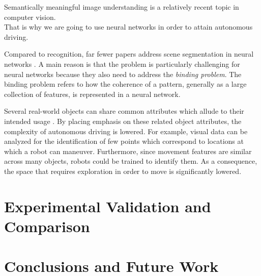 \documentclass[12pt,a4paper]{report}
\newcommand{\term}{\textit}
\begin{document}

	
	
	
	
	
	Semantically meaningful image understanding is a relatively recent topic in computer vision.
	\\
	
	
	
	That is why we are going to use neural networks in order to attain 
	autonomous driving. 
	\par
	Compared to recognition, far fewer papers address scene segmentation in neural 
	networks \cite{Wang}. A main reason is that the problem is particularly 
	challenging for neural networks because they also need to address the \term{binding 
	problem}. The binding problem refers to how the coherence of a pattern, generally 
	as a large collection of features, is represented in a neural network. 
	\par
	Several real-world objects can share common attributes which allude to their 
	intended usage \citep{Shabbir}. By placing emphasis on these related object 
	attributes, the complexity of autonomous driving is lowered. For example, visual 
	data can be analyzed for the identification of few points which correspond to 
	locations at which a robot can maneuver. Furthermore, since movement features 
	are similar across many objects, robots could be trained to identify them. As a 
	consequence, the space that requires exploration in order to move is 
	significantly lowered.
	\\
	

	
	
	
	
	
	
	\chapter{Experimental Validation and Comparison}
	\label{sec:exp}
	
	
	\chapter{Conclusions and Future Work}
	\label{sec:concl}
	
\end{document}

